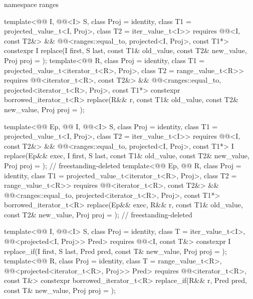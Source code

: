 \begin{codeblock}
{  namespace ranges {
    template<@@ I, @@<I> S, class Proj = identity,
             class T1 = projected_value_t<I, Proj>, class T2 = iter_value_t<I>>
      requires @@<I, const T2&> &&
               @@<ranges::equal_to, projected<I, Proj>, const T1*>
      constexpr I
        replace(I first, S last, const T1& old_value, const T2& new_value, Proj proj = {});
    template<@@ R, class Proj = identity,
             class T1 = projected_value_t<iterator_t<R>, Proj>, class T2 = range_value_t<R>>
      requires @@<iterator_t<R>, const T2&> &&
               @@<ranges::equal_to,
                                         projected<iterator_t<R>, Proj>, const T1*>
      constexpr borrowed_iterator_t<R>
        replace(R&& r, const T1& old_value, const T2& new_value, Proj proj = {});

    template<@@ Ep, @@ I, @@<I> S,
             class Proj = identity,
             class T1 = projected_value_t<I, Proj>, class T2 = iter_value_t<I>>
      requires @@<I, const T2&> &&
               @@<ranges::equal_to, projected<I, Proj>, const T1*>
      I replace(Ep&& exec, I first, S last,
                const T1& old_value, const T2& new_value, Proj proj = {});  // freestanding-deleted
    template<@@ Ep, @@ R, class Proj = identity,
             class T1 = projected_value_t<iterator_t<R>, Proj>, class T2 = range_value_t<R>>
      requires @@<iterator_t<R>, const T2&> &&
               @@<ranges::equal_to,
                                         projected<iterator_t<R>, Proj>, const T1*>
      borrowed_iterator_t<R>
        replace(Ep&& exec, R&& r, const T1& old_value, const T2& new_value,
                Proj proj = {});                                            // freestanding-deleted

    template<@@ I, @@<I> S, class Proj = identity,
             class T = iter_value_t<I>,
             @@<projected<I, Proj>> Pred>
      requires @@<I, const T&>
      constexpr I replace_if(I first, S last, Pred pred, const T& new_value, Proj proj = {});
    template<@@ R, class Proj = identity, class T = range_value_t<R>,
             @@<projected<iterator_t<R>, Proj>> Pred>
      requires @@<iterator_t<R>, const T&>
      constexpr borrowed_iterator_t<R>
        replace_if(R&& r, Pred pred, const T& new_value, Proj proj = {});

}}
\end{codeblock}
